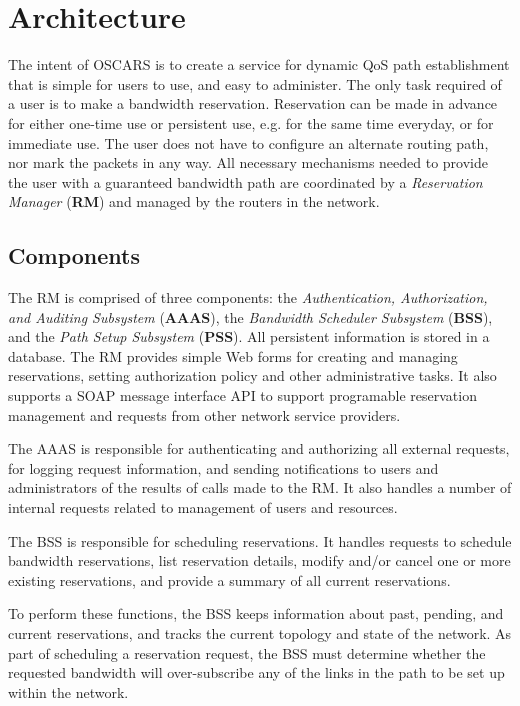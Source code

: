 \documentclass[conference]{IEEEtran}
\begin{document}
\section{Architecture}

The intent of OSCARS is to create a service for dynamic QoS path establishment
that is simple for users to use, and easy to administer.  The only task 
required of a user is to make a bandwidth reservation.  Reservation can be made 
in advance for either one-time use or persistent use, e.g. for the same time everyday, 
or for immediate use. The user does not have 
to configure an alternate routing path, nor mark the packets in any way.  All 
necessary mechanisms needed to provide the user with a guaranteed bandwidth 
path are coordinated by a  \emph{Reservation Manager} (\textbf{RM}) and managed by the routers 
in the network.

\subsection{Components}

The RM is comprised of three components:  the 
 \emph{Authentication, Authorization, and Auditing Subsystem} (\textbf{AAAS}), 
the  \emph{Bandwidth Scheduler Subsystem} (\textbf{BSS}), and the  \emph{Path 
Setup Subsystem} (\textbf{PSS}). All persistent information is stored in a database.  
The RM provides simple Web forms for creating and managing reservations, 
setting authorization policy and other administrative tasks.
It also supports a SOAP message interface API to support programable reservation 
management and requests from other network service providers.

The AAAS is responsible for authenticating and authorizing all external 
requests, for logging request information, and sending notifications to
users and administrators of the results of calls made to the RM.  It also
handles a number of internal requests related to management of users 
and resources.

The BSS is responsible for scheduling reservations.  It handles
requests to schedule bandwidth reservations, list reservation details,
modify and/or cancel one or more existing reservations, and provide a summary
of all current reservations.

To perform these functions, the BSS keeps information about past,
pending, and current reservations, and tracks the current topology and state of
the network.  As part of scheduling a reservation request, the BSS must
determine whether the requested bandwidth will over-subscribe any of the links
in the path to be set up within the network.
\end{document}
